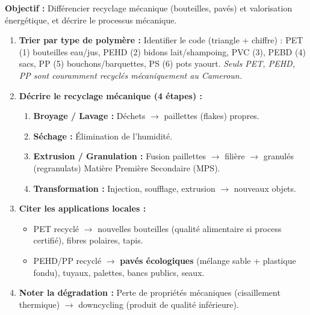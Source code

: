 \documentclass[11pt]{article}
\newcommand{\cle}[1]{{\popxbold\color{popdark}#1}}
\begin{document}
\begin{methode}
\textbf{Objectif :} Différencier recyclage mécanique (bouteilles, pavés) et valorisation énergétique, et décrire le processus mécanique.
\begin{enumerate}
    \item \textbf{Trier par type de polymère :} Identifier le code (triangle + chiffre) : \cle{PET (1)} bouteilles eau/jus, \cle{PEHD (2)} bidons lait/shampoing, \cle{PVC (3)}, \cle{PEBD (4)} sacs, \cle{PP (5)} bouchons/barquettes, \cle{PS (6)} pots yaourt. \emph{Seuls PET, PEHD, PP sont couramment recyclés mécaniquement au Cameroun.}
    \item \textbf{Décrire le recyclage mécanique (4 étapes) :}
    \begin{enumerate}
        \item \textbf{Broyage / Lavage :} Déchets $\rightarrow$ paillettes (flakes) propres.
        \item \textbf{Séchage :} Élimination de l'humidité.
        \item \textbf{Extrusion / Granulation :} Fusion paillettes $\rightarrow$ filière $\rightarrow$ granulés (regranulats) \cle{Matière Première Secondaire (MPS)}.
        \item \textbf{Transformation :} Injection, soufflage, extrusion $\rightarrow$ nouveaux objets.
    \end{enumerate}
    \item \textbf{Citer les applications locales :}
    \begin{itemize}
        \item PET recyclé $\rightarrow$ nouvelles bouteilles (qualité alimentaire si process certifié), fibres polaires, tapis.
        \item PEHD/PP recyclé $\rightarrow$ \textbf{pavés écologiques} (mélange sable + plastique fondu), tuyaux, palettes, bancs publics, seaux.
    \end{itemize}
    \item \textbf{Noter la dégradation :} Perte de propriétés mécaniques (cisaillement thermique) $\rightarrow$ \cle{downcycling} (produit de qualité inférieure).
\end{enumerate}
\end{methode}
\end{document}

